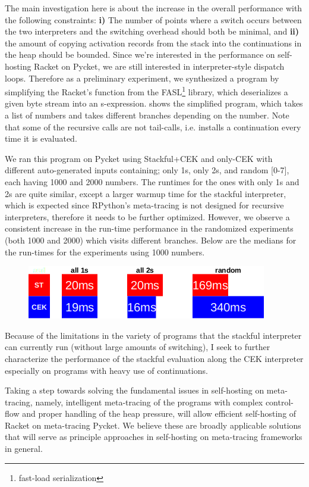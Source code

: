 The main investigation here is about the increase in the overall
performance with the following constraints: \textbf{i)} The number of
points where a switch occurs between the two interpreters and the
switching overhead should both be minimal, and \textbf{ii)} the amount
of copying activation records from the stack into the continuations in
the heap should be bounded. Since we're interested in the performance
on self-hosting Racket on Pycket, we are still interested in
interpreter-style dispatch loops. Therefore as a preliminary
experiment, we synthesized a program by simplifying the Racket's
 function from the FASL\footnote{fast-load
  serialization} library, which deserializes a given byte stream into
an s-expression.  shows the simplified program,
which takes a list of numbers and takes different branches depending
on the number. Note that some of the recursive calls are not
tail-calls, i.e. installs a continuation every time it is evaluated.

We ran this program on Pycket using Stackful+CEK and only-CEK with
different auto-generated inputs containing; only 1s, only 2s, and
random [0-7], each having 1000 and 2000 numbers. The runtimes for the
ones with only 1s and 2s are quite similar, except a larger warmup
time for the stackful interpreter, which is expected since RPython's
meta-tracing is not designed for recursive interpreters, therefore it
needs to be further optimized. However, we observe a consistent
increase in the run-time performance in the randomized experiments
(both 1000 and 2000) which visits different branches. Below are the
medians for the run-times for the experiments using 1000 numbers.

\begin{figure}[h!]
  \centering
  \includegraphics[scale=0.5]{img/stackful2}
\end{figure}

Because of the limitations in the variety of programs that the
stackful interpreter can currently run (without large amounts of
switching), I seek to further characterize the performance of the
stackful evaluation along the CEK interpreter especially on programs
with heavy use of continuations.

Taking a step towards solving the fundamental issues in self-hosting
on meta-tracing, namely, intelligent meta-tracing of the programs with
complex control-flow and proper handling of the heap pressure, will
allow efficient self-hosting of Racket on meta-tracing Pycket. We
believe these are broadly applicable solutions that will serve as
principle approaches in self-hosting on meta-tracing frameworks in
general.
